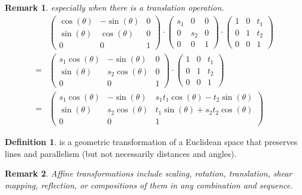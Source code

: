 \documentclass[a4paper]{article}
\theoremstyle{definition}
\newtheorem{definition}{Definition}
\theoremstyle{plain}
\newtheorem{remark}{Remark}
\begin{document}
\begin{remark}
especially when there is a translation operation.
\begin{align*}
    &
    \begin{pmatrix} 
        \cos(\theta) & -\sin(\theta) & 0\\ 
        \sin(\theta) & \cos(\theta) & 0\\ 
        0 & 0 & 1
    \end{pmatrix}\cdot
    \begin{pmatrix} 
        s_{1} & 0 & 0\\ 
        0 & s_{2} & 0\\ 
        0 & 0 & 1
    \end{pmatrix}\cdot
    \begin{pmatrix} 
        1 & 0 & t_1\\ 
        0 & 1 & t_2\\ 
        0 & 0 & 1
    \end{pmatrix}\\
    =&\begin{pmatrix} 
        s_1\cos(\theta) & -\sin(\theta) & 0\\ 
        \sin(\theta) & s_2\cos(\theta) & 0\\ 
        0 & 0 & 1
    \end{pmatrix}\cdot
    \begin{pmatrix} 
        1 & 0 & t_1\\ 
        0 & 1 & t_2\\ 
        0 & 0 & 1
    \end{pmatrix}\\
    =&\begin{pmatrix} 
        s_1\cos(\theta) & -\sin(\theta) & s_1t_1\cos(\theta)-t_2\sin(\theta)\\ 
        \sin(\theta) & s_2\cos(\theta) & t_1\sin(\theta)+s_2t_2\cos(\theta)\\ 
        0 & 0 & 1
    \end{pmatrix}
\end{align*}
\end{remark}

\begin{definition}
 is a geometric transformation of a Euclidean space that preserves lines and parallelism (but not necessarily distances and angles).
\end{definition}

\begin{remark}
Affine transformations include scaling, rotation, translation, shear mapping, reflection, or compositions of them in any combination and sequence.
\end{remark}
\end{document}
